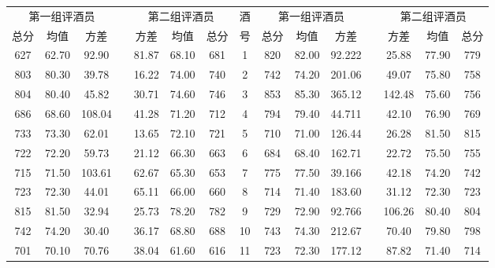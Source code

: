 \documentclass[nocover]{cumcmart}%
\begin{document}
    \begin{table}[!htbp]
    \centering
        \begin{tabular}{ccccccccccccccc}
        \toprule
        \multicolumn{3}{c}{第一组评酒员} &  & \multicolumn{3}{c}{第二组评酒员} & 酒 & \multicolumn{3}{c}{第一组评酒员} &  & \multicolumn{3}{c}{第二组评酒员} \\
        \cmidrule{1-3}  \cmidrule{5-7}   \cmidrule{9-11}  \cmidrule{13-15}
            总分    &    均值   &   方差   &  &  方差     &    均值   &  总分   & 号  & 总分    &    均值   &   方差   &  &  方差     &    均值   &  总分\\
        \midrule

            627  &  62.70  &  92.90   &  &  81.87  &  68.10  &  681  &  1   &  820  &   82.00  &  92.222   &   &  25.88   &   77.90   &   779   \\
            803  &  80.30  &  39.78   &  &  16.22  &  74.00  &  740  &  2   &  742  &   74.20  &  201.06   &   &  49.07   &   75.80   &   758   \\
            804  &  80.40  &  45.82   &  &  30.71  &  74.60  &  746  &  3   &  853  &   85.30  &  365.12   &   &  142.48  &   75.60   &   756   \\
            686  &  68.60  &  108.04  &  &  41.28  &  71.20  &  712  &  4   &  794  &   79.40  &  44.711   &   &  42.10   &   76.90   &   769   \\
            733  &  73.30  &  62.01   &  &  13.65  &  72.10  &  721  &  5   &  710  &   71.00  &  126.44   &   &  26.28   &   81.50   &   815   \\
            722  &  72.20  &  59.73   &  &  21.12  &  66.30  &  663  &  6   &  684  &   68.40  &  162.71   &   &  22.72   &   75.50   &   755   \\
            715  &  71.50  &  103.61  &  &  62.67  &  65.30  &  653  &  7   &  775  &   77.50  &  39.166   &   &  42.18   &   74.20   &   742   \\
            723  &  72.30  &  44.01   &  &  65.11  &  66.00  &  660  &  8   &  714  &   71.40  &  183.60   &   &  31.12   &   72.30   &   723   \\
            815  &  81.50  &  32.94   &  &  25.73  &  78.20  &  782  &  9   &  729  &   72.90  &  92.766   &   &  106.26  &   80.40   &   804   \\
            742  &  74.20  &  30.40   &  &  36.17  &  68.80  &  688  &  10  &  743  &   74.30  &  212.67   &   &  70.40   &   79.80   &   798   \\
            701  &  70.10  &  70.76   &  &  38.04  &  61.60  &  616  &  11  &  723  &   72.30  &  177.12   &   &  87.82   &   71.40   &   714   \\

\end{tabular}
\end{table}
\end{document}
